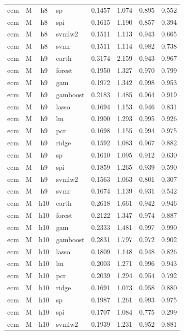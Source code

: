 \begin{ThreePartTable}
\begin{longtable}[t]{llclcccc}
ecm & M & h8 & sp & 0.1457 & 1.074 & 0.895 & 0.552\\
ecm & M & h8 & spi & 0.1615 & 1.190 & 0.857 & 0.394\\
ecm & M & h8 & svmlw2 & 0.1511 & 1.113 & 0.943 & 0.665\\
ecm & M & h8 & svmr & 0.1511 & 1.114 & 0.982 & 0.738\\
\addlinespace
ecm & M & h9 & earth & 0.3174 & 2.159 & 0.943 & 0.967\\
ecm & M & h9 & forest & 0.1950 & 1.327 & 0.970 & 0.799\\
ecm & M & h9 & gam & 0.1972 & 1.342 & 0.998 & 0.953\\
ecm & M & h9 & gamboost & 0.2183 & 1.485 & 0.964 & 0.919\\
ecm & M & h9 & lasso & 0.1694 & 1.153 & 0.946 & 0.831\\
ecm & M & h9 & lm & 0.1900 & 1.293 & 0.995 & 0.926\\
ecm & M & h9 & pcr & 0.1698 & 1.155 & 0.994 & 0.975\\
ecm & M & h9 & ridge & 0.1592 & 1.083 & 0.967 & 0.882\\
ecm & M & h9 & sp & 0.1610 & 1.095 & 0.912 & 0.630\\
ecm & M & h9 & spi & 0.1859 & 1.265 & 0.939 & 0.590\\
ecm & M & h9 & svmlw2 & 0.1563 & 1.063 & 0.801 & 0.307\\
ecm & M & h9 & svmr & 0.1674 & 1.139 & 0.931 & 0.542\\
\addlinespace
ecm & M & h10 & earth & 0.2618 & 1.661 & 0.942 & 0.946\\
ecm & M & h10 & forest & 0.2122 & 1.347 & 0.974 & 0.887\\
ecm & M & h10 & gam & 0.2333 & 1.481 & 0.997 & 0.990\\
ecm & M & h10 & gamboost & 0.2831 & 1.797 & 0.972 & 0.902\\
ecm & M & h10 & lasso & 0.1809 & 1.148 & 0.948 & 0.826\\
ecm & M & h10 & lm & 0.2003 & 1.271 & 0.996 & 0.943\\
ecm & M & h10 & pcr & 0.2039 & 1.294 & 0.954 & 0.792\\
ecm & M & h10 & ridge & 0.1691 & 1.073 & 0.958 & 0.880\\
ecm & M & h10 & sp & 0.1987 & 1.261 & 0.993 & 0.975\\
ecm & M & h10 & spi & 0.1707 & 1.084 & 0.775 & 0.299\\
ecm & M & h10 & svmlw2 & 0.1939 & 1.231 & 0.952 & 0.881\\

\end{longtable}
\end{ThreePartTable}
